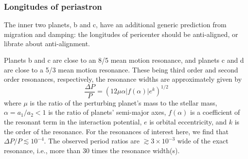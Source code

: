 \documentclass[twocolumn]{aastex63}
\begin{document}
\subsubsection{Longitudes of periastron}

The inner two planets, b and c, have an additional generic prediction from
migration and damping:
the longitudes of pericenter should be anti-aligned, or librate about
anti-alignment. %

Planets b and c are close to an 8/5 mean motion resonance, and planets c and d are close to a 5/3 mean motion resonance. These being third order and second order resonances, respectively, the resonance widths are approximately given by~\citep{Murray1999}
\begin{equation}
    \frac{\Delta P}{P} = (12\mu\alpha |f(\alpha)| e^k)^{1/2}
    \label{e:reswidth}\end{equation}
where $\mu$ is the ratio of the perturbing planet's mass to the stellar mass, $\alpha{=}a_1/a_2{<}1$ is the ratio of planets' semi-major axes, $f(\alpha)$ is a coefficient of the resonant term in the interaction potential, $e$ is orbital eccentricity, and $k$ is the order of the resonance.  For the resonances of interest here, we find that $\Delta P/P\lesssim10^{-4}$. The observed period ratios are $\gtrsim3\times10^{-3}$ wide of the exact resonance, i.e., more than 30 times the resonance width(s).
\end{document}
